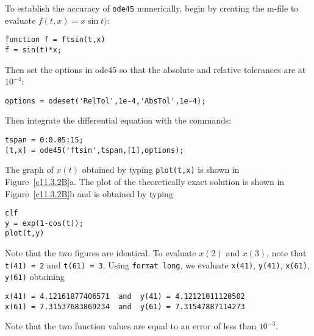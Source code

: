 \documentclass{ximera}
\begin{document}
\begin{exercise}
\begin{solution}
To establish the accuracy of {\tt ode45} numerically, begin by creating the 
m-file to evaluate $f(t,x)=x\sin t)$:
\begin{verbatim}
function f = ftsin(t,x)
f = sin(t)*x;
\end{verbatim}
Then set the options in {\sf ode45} so that the absolute and relative
tolerances are at $10^{-4}$:
\begin{verbatim}
options = odeset('RelTol',1e-4,'AbsTol',1e-4);
\end{verbatim}
Then integrate the differential equation with the commands:
\begin{verbatim}
tspan = 0:0.05:15;
[t,x] = ode45('ftsin',tspan,[1],options);
\end{verbatim}
The graph of $x(t)$ obtained by typing {\tt plot(t,x)} is shown in
Figure~\ref{c11.3.2B}a.  The plot of the theoretically exact solution
is shown in Figure~\ref{c11.3.2B}b and is obtained by typing
\begin{verbatim}
clf
y = exp(1-cos(t));
plot(t,y)
\end{verbatim}
Note that the two figures are identical.  To evaluate $x(2)$ and $x(3)$,
note that {\tt t(41) = 2} and {\tt t(61) = 3}.  Using {\tt format long}, we
evaluate {\tt x(41)}, {\tt y(41)}, {\tt x(61)}, {\tt y(61)} obtaining
\begin{verbatim}
x(41) = 4.12161877406571  and  y(41) = 4.12121011120502
x(61) = 7.31537683869234  and  y(61) = 7.31547887114273
\end{verbatim}
Note that the two function values are equal to an error of less than 
$10^{-3}$.

\begin{figure}[htb]
     \centerline{%
     }
\end{figure} 




\end{solution}
\end{exercise}
\end{document}
